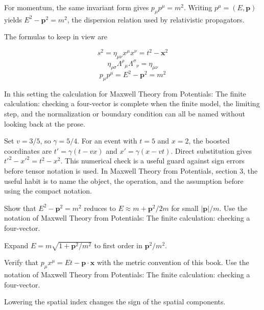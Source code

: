 For momentum, the same invariant form gives \(p_\mu p^\mu=m^2\).  Writing \(p^\mu=(E,\bm p)\) yields \(E^2-\bm p^2=m^2\), the dispersion relation used by relativistic propagators.

The formulas to keep in view are

\[
  s^2=\eta_{\mu\nu}x^\mu x^\nu=t^2-\bm x^2
\]
\[
  \eta_{\rho\sigma}\Lambda^\rho{}_\mu\Lambda^\sigma{}_\nu=\eta_{\mu\nu}
\]
\[
  p_\mu p^\mu=E^2-\bm p^2=m^2
\]

In this setting the calculation for Maxwell Theory from Potentials: The finite calculation: checking a four-vector is complete when the finite model, the limiting step, and the normalization or boundary condition can all be named without looking back at the prose.




\begin{example}
Set \(v=3/5\), so \(\gamma=5/4\).  For an event with \(t=5\) and \(x=2\), the boosted coordinates are \(t'=\gamma(t-vx)\) and \(x'=\gamma(x-vt)\).  Direct substitution gives \(t'^2-x'^2=t^2-x^2\).  This numerical check is a useful guard against sign errors before tensor notation is used.  In Maxwell Theory from Potentials, section 3, the useful habit is to name the object, the operation, and the assumption before using the compact notation.
\end{example}



\begin{exercise}
Show that \(E^2-\bm p^2=m^2\) reduces to \(E\approx m+\bm p^2/2m\) for small \(|\bm p|/m\).  Use the notation of Maxwell Theory from Potentials: The finite calculation: checking a four-vector.
\begin{answer}
Expand \(E=m\sqrt{1+\bm p^2/m^2}\) to first order in \(\bm p^2/m^2\).
\end{answer}
\end{exercise}

\begin{exercise}
Verify that \(p_\mu x^\mu=Et-\bm p\cdot\bm x\) with the metric convention of this book.  Use the notation of Maxwell Theory from Potentials: The finite calculation: checking a four-vector.
\begin{answer}
Lowering the spatial index changes the sign of the spatial components.
\end{answer}
\end{exercise}



